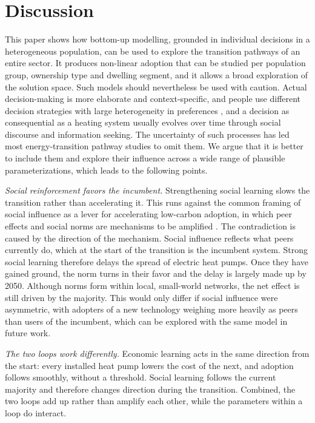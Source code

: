 \documentclass[preprint,12pt,authoryear]{elsarticle}
\begin{document}
\section{Discussion}
\label{sec:discussion}
This paper shows how bottom-up modelling, grounded in individual decisions in
a heterogeneous population, can be used to explore the transition pathways of
an entire sector. It produces non-linear adoption that can be studied per
population group, ownership type and dwelling segment, and it allows a broad
exploration of the solution space. Such models should nevertheless be used
with caution. Actual decision-making is more elaborate and context-specific,
and people use different decision strategies
\citep{michelsenMotivationalFactorsInfluencing2013} with large heterogeneity
in preferences \citep{melesHeterogeneityPreferencesRenewable2022}, and a
decision as consequential as a heating system usually evolves over time
through social discourse and information seeking. The uncertainty of such
processes has led most energy-transition pathway studies to omit them. We
argue that it is better to include them and explore their influence across a
wide range of plausible parameterizations, which leads to the following
points.

\emph{Social reinforcement favors the incumbent.} Strengthening social
learning slows the transition rather than accelerating it. This runs against
the common framing of social influence as a lever for accelerating low-carbon
adoption, in which peer effects and social norms are mechanisms to be
amplified \citep{wiedermannNetworkbasedMicrofoundationGranovetters2020,
lentonOperationalisingPositiveTipping2022/ed}. The contradiction is caused by
the direction of the mechanism. Social influence
reflects what peers currently do, which at the start of the transition is the
incumbent system. Strong social learning therefore delays the spread of
electric heat pumps. Once they have gained ground, the norm turns in their
favor and the delay is largely made up by 2050. Although norms form within
local, small-world networks, the net effect is still driven by the majority.
This would only differ if social influence were asymmetric, with adopters of
a new technology weighing more heavily as peers than users of the incumbent,
which can be explored with the same model in future work.

\emph{The two loops work differently.} Economic learning acts in the same
direction from the start: every installed heat pump lowers the cost of the
next, and adoption follows smoothly, without a threshold. Social learning
follows the current majority and therefore changes direction during the
transition. Combined, the two loops add up rather than amplify each other,
while the parameters within a loop do interact.
\end{document}
